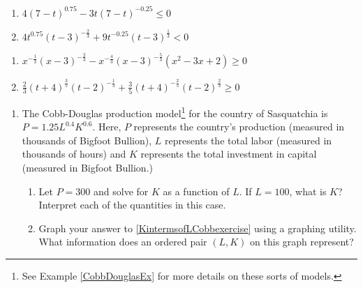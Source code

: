 \documentclass{ximera}
\begin{document}
\begin{multicols}{2}
\begin{enumerate}
\setcounter{enumi}{\value{HW}}

\item $4(7-t)^{0.75} - 3t(7-t)^{-0.25} \leq 0$   %

\item $4t^{0.75}(t - 3)^{-\frac{2}{3}} +9t^{-0.25}(t - 3)^{\frac{1}{3}} < 0$

\setcounter{HW}{\value{enumi}}
\end{enumerate}
\end{multicols}

\begin{enumerate}
\setcounter{enumi}{\value{HW}}


\item $x^{-\frac{1}{3}} (x-3)^{-\frac{2}{3}} - x^{-\frac{4}{3}} (x-3)^{-\frac{5}{3}} (x^2-3x+2) \geq 0$  
\item $\frac{2}{3}(t + 4)^{\frac{3}{5}}(t - 2)^{-\frac{1}{3}} + \frac{3}{5}(t + 4)^{-\frac{2}{5}}(t - 2)^{\frac{2}{3}} \geq 0$ \label{powereqineqexlasta}

\setcounter{HW}{\value{enumi}}
\end{enumerate}




\begin{enumerate}
\setcounter{enumi}{\value{HW}}
\item The Cobb-Douglas production model\footnote{See Example \ref{CobbDouglasEx} for more details on these sorts of models.} for the country of Sasquatchia is $P = 1.25L^{0.4}K^{0.6}$.  Here, $P$ represents the country's production (measured in thousands of Bigfoot  Bullion), $L$ represents the total labor (measured in thousands of hours) and $K$ represents the total investment in capital (measured in Bigfoot Bullion.)

\begin{enumerate}

\item \label{KintermsofLCobbexercise}Let $P = 300$ and solve for $K$ as a function of  $L$.  If $L = 100$, what is $K$?  Interpret each of the quantities in this case.

\item Graph your answer to \ref{KintermsofLCobbexercise} using a graphing utility.  What information does an ordered pair $(L, K)$ on this graph represent?  

\end{enumerate}

\end{enumerate}
\end{document}
